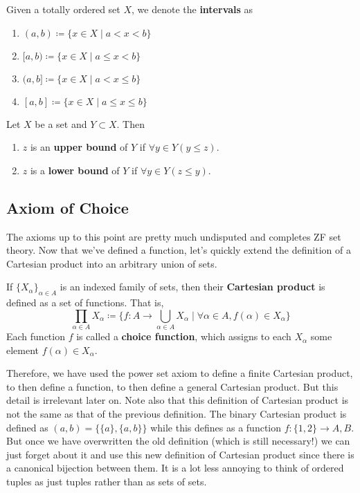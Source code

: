   \begin{definition}[Interval]
    Given a totally ordered set $X$, we denote the \textbf{intervals} as 
    \begin{enumerate}
      \item $(a, b) \coloneqq \{x \in X \mid a < x < b \}$
      \item $[a, b) \coloneqq \{x \in X \mid a \leq x < b \}$
      \item $(a, b] \coloneqq \{x \in X \mid a < x \leq b \}$
      \item $[a, b] \coloneqq \{x \in X \mid a \leq x \leq b \}$
    \end{enumerate}
  \end{definition} 

  \begin{definition}[Bounds]
    Let $X$ be a set and $Y \subset X$. Then 
    \begin{enumerate}
      \item $z$ is an \textbf{upper bound} of $Y$ if $\forall y \in Y (y \leq z)$. 
      \item $z$ is a \textbf{lower bound} of $Y$ if $\forall y \in Y (z \leq y)$. 
    \end{enumerate}
  \end{definition}

\subsection{Axiom of Choice}

  The axioms up to this point are pretty much undisputed and completes ZF set theory. Now that we've defined a function, let's quickly extend the definition of a Cartesian product into an arbitrary union of sets. 
  
  \begin{definition}
    If $\{X_\alpha\}_{\alpha \in A}$ is an indexed family of sets, then their \textbf{Cartesian product} is defined as a set of functions. That is, 
    \begin{equation}
      \prod_{\alpha \in A} X_\alpha \coloneqq \bigg\{ f: A \rightarrow \bigcup_{\alpha \in A} X_\alpha \;\Big|\; \forall \alpha \in A, f(\alpha) \in X_\alpha \bigg\} 
    \end{equation}
    Each function $f$ is called a \textbf{choice function}, which assigns to each $X_\alpha$ some element $f(\alpha) \in X_\alpha$. 
  \end{definition} 

  Therefore, we have used the power set axiom to define a finite Cartesian product, to then define a function, to then define a general Cartesian product. But this detail is irrelevant later on. Note also that this definition of Cartesian product is not the same as that of the previous definition. The binary Cartesian product is defined as $(a, b) = \{\{a\}, \{a, b\}\}$ while this defines as a function $f: \{1, 2\} \rightarrow A, B$. But once we have overwritten the old definition (which is still necessary!) we can just forget about it and use this new definition of Cartesian product since there is a canonical bijection between them. It is a lot less annoying to think of ordered tuples as just tuples rather than as sets of sets. 

